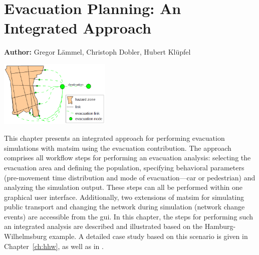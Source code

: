\chapter{Evacuation Planning: An Integrated Approach}
\label{ch:evacuation}

\hfill \textbf{Author:} Gregor Lämmel, Christoph Dobler, Hubert Klüpfel 

\begin{center} \includegraphics[width=0.4\textwidth, angle=0]{extending/figures/Evacuation/evacuation} \end{center}



This chapter presents an integrated approach for performing evacuation simulations with \gls{matsim} using the evacuation contribution. %
The approach comprises all workflow steps for performing an evacuation analysis: \ie selecting the evacuation area and defining the population, specifying  behavioral parameters (\ie  pre-movement time distribution and mode of evacuation---car or pedestrian) and analyzing the simulation output. These steps can all be performed within one graphical user interface. Additionally, two extensions of \gls{matsim} for simulating public transport and changing the network during simulation (\ie network change events) are accessible from the \gls{gui}. In this chapter, the steps for performing such an integrated analysis are described and illustrated based on the Hamburg-Wilhelmsburg example. A detailed case study based on this scenario is given in Chapter~\ref{ch:hhw}, as well as in \citet{00DurstAtAl2012PEDGRIPSAppl,Hugenbusch2012Bachelor}.

